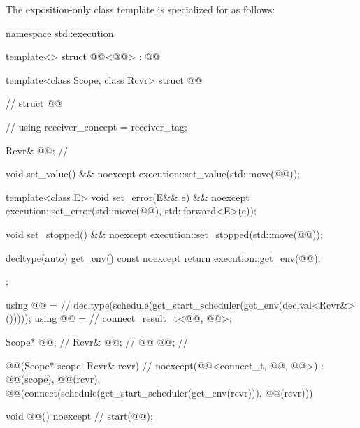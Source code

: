 \pnum
The exposition-only class template 
is specialized for  as follows:

%
\begin{codeblock}
namespace std::execution {
  template<>
  struct @@<@@> : @@ {
    template<class Scope, class Rcvr>
    struct @@ {                          // \expos
      struct @@ {                       // \expos
        using receiver_concept = receiver_tag;

        Rcvr& @@;                         // \expos

        void set_value() && noexcept {
          execution::set_value(std::move(@@));
        }

        template<class E>
          void set_error(E&& e) && noexcept {
            execution::set_error(std::move(@@), std::forward<E>(e));
          }

        void set_stopped() && noexcept {
          execution::set_stopped(std::move(@@));
        }

        decltype(auto) get_env() const noexcept {
          return execution::get_env(@@);
        }
      };

      using @@ =                  // \expos
        decltype(schedule(get_start_scheduler(get_env(declval<Rcvr&>()))));
      using @@ =                          // \expos
        connect_result_t<@@, @@>;

      Scope* @@;                         // \expos
      Rcvr& @@;                       // \expos
      @@ @@;                              // \expos

      @@(Scope* scope, Rcvr& rcvr)       // \expos
        noexcept(@@<connect_t, @@, @@>)
        : @@(scope),
          @@(rcvr),
          @@(connect(schedule(get_start_scheduler(get_env(rcvr))), @@(rcvr))) {}

      void @@() noexcept {            // \expos
        start(@@);
      }

}}}
\end{codeblock}
